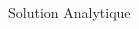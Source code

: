 \documentclass[aspectratio=169, french]{beamer}
\begin{document}
\begin{frame}{Solution Analytique}
\begin{columns}
\begin{column}{.6\textwidth}
\begin{figure}
		\end{figure}
	\end{column}
\end{columns}	

\end{frame}
\end{document}
